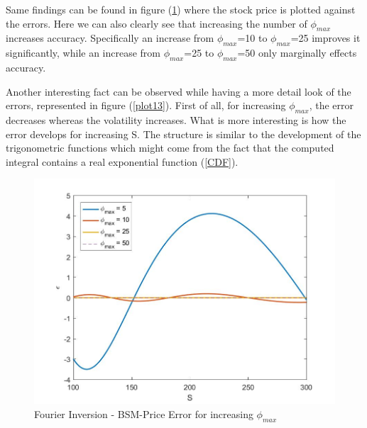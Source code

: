 \documentclass[a4paper,11pt]{article}
\begin{document}
Same findings can be found in figure (\ref{plot12}) where the stock price is plotted against the errors. Here we can also clearly see that increasing the number of $\phi_{max}$ increases accuracy. Specifically an increase from $\phi_{max}$=10 to $\phi_{max}$=25 improves it significantly, while an increase from $\phi_{max}$=25 to $\phi_{max}$=50 only marginally effects accuracy.

Another interesting fact can be observed while having a more detail look of the errors, represented in figure (\ref{plot13}). First of all, for increasing $\phi_{max}$, the error decreases whereas the volatility increases. What is more interesting is how the error develops for increasing S. The structure is similar to the development of the trigonometric functions which might come from the fact that the computed integral contains a real exponential function (\ref{CDF}). 
\begin{figure}[!h]
\includegraphics[width=12cm]{plot15.jpeg}
\centering
\caption{Fourier Inversion - BSM-Price Error for increasing $\phi_{max}$}
\label{plot12}
\end{figure}
\end{document}
